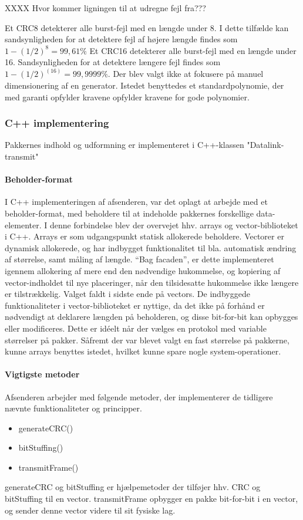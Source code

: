 XXXX Hvor kommer ligningen til at udregne fejl fra???

Et CRC8 detekterer alle burst-fejl med en længde under 8. I dette tilfælde kan sandsynligheden for at detektere fejl af højere længde findes som $1-(1/2)^8 = 99,61\%$
Et CRC16 detekterer alle burst-fejl med en længde under 16. Sandsynligheden for at detektere længere fejl findes som $1-(1/2)^(16) = 99,9999\%.$
    Der blev valgt ikke at fokusere på manuel dimensionering af en generator. Istedet benyttedes et standardpolynomie, der med garanti opfylder kravene opfylder kravene for gode polynomier.

\subsubsection{C++ implementering}
Pakkernes indhold og udformning er implementeret i C++-klassen "Datalink-transmit"


\paragraph{Beholder-format}\hfill \break
I C++ implementeringen af afsenderen, var det oplagt at arbejde med et beholder-format, med beholdere til at indeholde pakkernes forskellige data-elementer.
I denne forbindelse blev der overvejet hhv. arrays og vector-biblioteket i C++. 
Arrays er som udgangspunkt statisk allokerede beholdere.
Vectorer er dynamisk allokerede, og har indbygget funktionalitet til bla. automatisk ændring af størrelse, samt måling af længde. “Bag facaden”, er dette implementeret igennem allokering af mere end den nødvendige hukommelse, og kopiering af vector-indholdet til nye placeringer, når den tilsidesatte hukommelse ikke længere er tilstrækkelig. 
Valget faldt i sidste ende på vectors. De indbyggede funktionaliteter i vector-biblioteket er nyttige, da det ikke på forhånd er nødvendigt at deklarere længden på beholderen, og disse bit-for-bit kan opbygges eller modificeres. Dette er idéelt når der vælges en protokol med variable størrelser på pakker. Såfremt der var blevet valgt en fast størrelse på pakkerne, kunne arrays benyttes istedet, hvilket kunne spare nogle system-operationer.

\paragraph{Vigtigste metoder}\hfill \break
Afsenderen arbejder med følgende metoder, der implementerer de tidligere nævnte funktionaliteter og principper.
\begin{itemize}[noitemsep]
  \item generateCRC()
  \item bitStuffing()
  \item transmitFrame()
  \end{itemize}
generateCRC og bitStuffing er hjælpemetoder der tilføjer hhv. CRC og bitStuffing til en vector.
transmitFrame opbygger en pakke bit-for-bit i en vector, og sender denne vector videre til sit fysiske lag.

